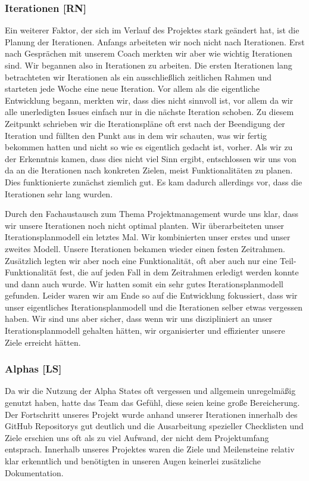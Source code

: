 \documentclass[10pt]{article}
\begin{document}
\subsubsection{Iterationen [RN]}
Ein weiterer Faktor, der sich im Verlauf des Projektes stark geändert hat, ist die Planung der Iterationen.
Anfangs arbeiteten wir noch nicht nach Iterationen. Erst nach Gesprächen mit unserem Coach merkten wir aber
wie wichtig Iterationen sind. Wir begannen also in Iterationen zu arbeiten. Die ersten Iterationen lang
betrachteten wir Iterationen als ein ausschließlich zeitlichen Rahmen und starteten jede Woche eine neue Iteration.
Vor allem als die eigentliche Entwicklung begann, merkten wir, dass dies nicht sinnvoll ist, vor allem
da wir alle unerledigten Issues einfach nur in die nächste Iteration schoben. Zu diesem Zeitpunkt schrieben wir
die Iterationspläne oft erst nach der Beendigung der Iteration und füllten den Punkt  aus in dem
wir schauten, was wir fertig bekommen hatten und nicht so wie es eigentlich gedacht ist, vorher.
Als wir zu der Erkenntnis kamen, dass dies nicht viel Sinn ergibt, entschlossen wir uns von da an
die Iterationen nach konkreten Zielen, meist Funktionalitäten zu planen. Dies funktionierte zunächst ziemlich gut.
Es kam dadurch allerdings vor, dass die Iterationen sehr lang wurden.\par
\medskip
Durch den Fachaustausch zum Thema Projektmanagement wurde uns klar, dass wir unsere Iterationen noch nicht optimal planten.
Wir überarbeiteten unser Iterationsplanmodell ein letztes Mal. Wir kombinierten unser erstes und unser zweites Modell.
Unsere Iterationen bekamen wieder einen festen Zeitrahmen. Zusätzlich legten wir aber noch eine Funktionalität, oft
aber auch nur eine Teil-Funktionalität fest, die auf jeden Fall in dem Zeitrahmen erledigt werden konnte und dann auch wurde.
Wir hatten somit ein sehr gutes Iterationsplanmodell gefunden. Leider waren wir am Ende so auf die
Entwicklung fokussiert, dass wir unser eigentliches Iterationsplanmodell und die Iterationen selber etwas vergessen
haben. Wir sind uns aber sicher, dass wenn wir uns diszipliniert an unser Iterationsplanmodell gehalten hätten,
wir organisierter und effizienter unsere Ziele erreicht hätten.

\subsubsection{Alphas [LS]}
Da wir die Nutzung der Alpha States oft vergessen und allgemein unregelmäßig genutzt haben, hatte das Team das Gefühl, diese seien 
keine große Bereicherung. Der Fortschritt unseres Projekt wurde anhand unserer Iterationen innerhalb des GitHub Repositorys gut deutlich und die
Ausarbeitung spezieller Checklisten und Ziele erschien uns oft als zu viel Aufwand, der nicht dem Projektumfang entsprach. Innerhalb unseres Projektes
waren die Ziele und Meilensteine relativ klar erkenntlich und benötigten in unseren Augen keinerlei zusätzliche Dokumentation.
\end{document}
